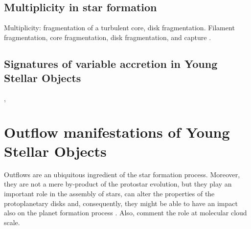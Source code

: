\documentclass[12pt]{mythesis}
\begin{document}
\subsection{Multiplicity in star formation}

Multiplicity: fragmentation of a turbulent core, disk fragmentation. Filament fragmentation, core fragmentation, disk fragmentation, and capture \citep{offner2023}.

\subsection{Signatures of variable accretion in Young Stellar Objects}

\citep{fischer2023}, \citep{audard2014}




\section{Outflow manifestations of Young Stellar Objects}


Outflows are an ubiquitous ingredient of the star formation process. Moreover, they are not a mere by-product of the protostar evolution, but they play an important role in the assembly of stars, can alter the properties of the protoplanetary disks and, consequently, they might be able to have an impact also on the planet formation process \cite{frank2014}. Also, comment the role at molecular cloud scale.
\end{document}
